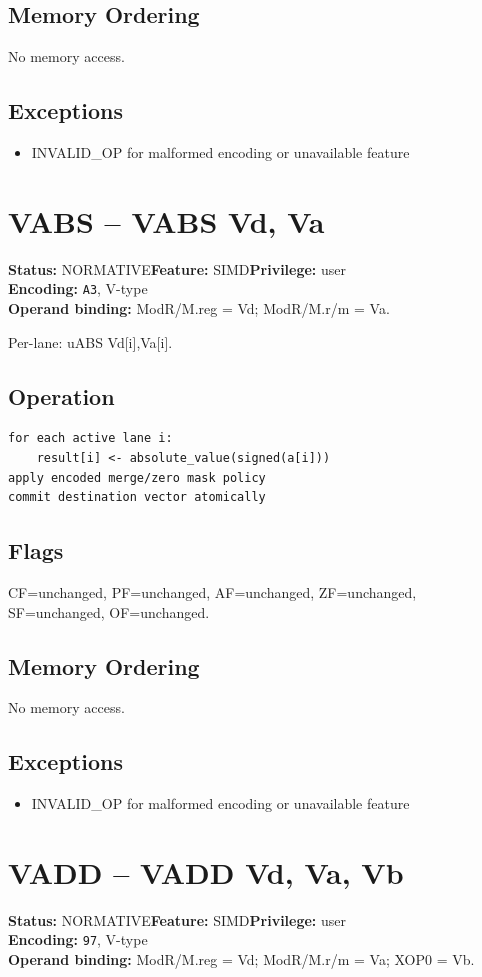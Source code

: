 \documentclass[10pt]{article}
\begin{document}
\subsection*{Memory Ordering}
No memory access.
\subsection*{Exceptions}
\begin{itemize}
\item INVALID\_OP for malformed encoding or unavailable feature
\end{itemize}
\clearpage

\section{VABS -- VABS Vd, Va}
\textbf{Status:} NORMATIVE\quad \textbf{Feature:} SIMD\quad \textbf{Privilege:} user\\
\textbf{Encoding:} \texttt{A3}, V-type\\
\textbf{Operand binding:} ModR/M.reg = Vd; ModR/M.r/m = Va.

Per-lane: uABS Vd[i],Va[i].

\subsection*{Operation}
\begin{lstlisting}
for each active lane i:
    result[i] <- absolute_value(signed(a[i]))
apply encoded merge/zero mask policy
commit destination vector atomically
\end{lstlisting}
\subsection*{Flags}
CF=unchanged, PF=unchanged, AF=unchanged, ZF=unchanged, SF=unchanged, OF=unchanged.
\subsection*{Memory Ordering}
No memory access.
\subsection*{Exceptions}
\begin{itemize}
\item INVALID\_OP for malformed encoding or unavailable feature
\end{itemize}
\clearpage

\section{VADD -- VADD Vd, Va, Vb}
\textbf{Status:} NORMATIVE\quad \textbf{Feature:} SIMD\quad \textbf{Privilege:} user\\
\textbf{Encoding:} \texttt{97}, V-type\\
\textbf{Operand binding:} ModR/M.reg = Vd; ModR/M.r/m = Va; XOP0 = Vb.
\end{document}
